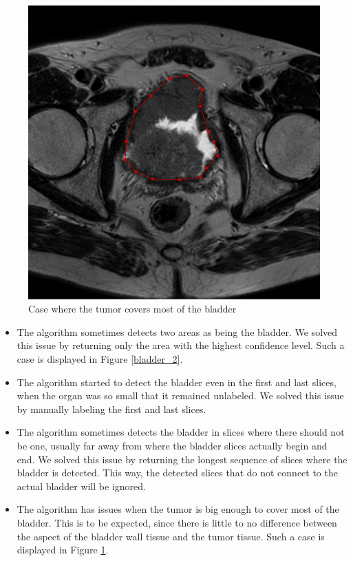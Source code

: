 \documentclass[runningheads,a4paper,11pt]{report}
\begin{document}
\begin{figure}[!tbp]
\begin{minipage}[b]{0.4\textwidth}
    \includegraphics[width=\textwidth]{images/bladder_3.png}
    \caption{Case where the tumor covers most of the bladder} \label{bladder_3}
  \end{minipage}
\end{figure}

\begin{itemize}
    \item The algorithm sometimes detects two areas as being the bladder. We solved this issue by returning only the area with the highest confidence level. Such a case is displayed in Figure \ref{bladder_2}.
    \item The algorithm started to detect the bladder even in the first and last slices, when the organ was so small that it remained unlabeled. We solved this issue by manually labeling the first and last slices.
    \item The algorithm sometimes detects the bladder in slices where there should not be one, usually far away from where the bladder slices actually begin and end. We solved this issue by returning the longest sequence of slices where the bladder is detected. This way, the detected slices that do not connect to the actual bladder will be ignored.
    \item The algorithm has issues when the tumor is big enough to cover most of the bladder. This is to be expected, since there is little to no difference between the aspect of the bladder wall tissue and the tumor tissue. Such a case is displayed in Figure \ref{bladder_3}.
\end{itemize}
\end{document}
